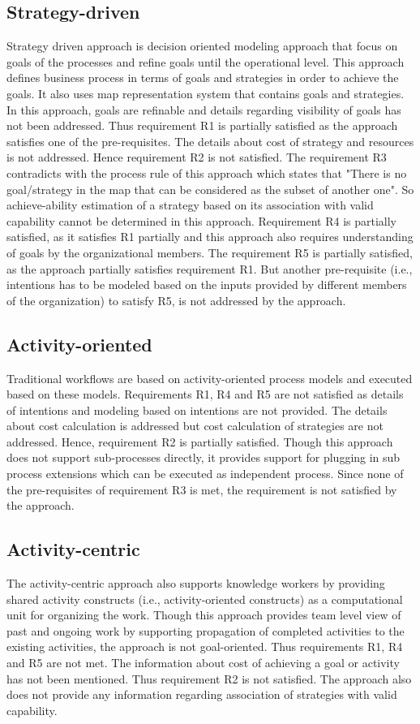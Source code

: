 \subsection{Strategy-driven} 
Strategy driven approach is decision oriented modeling approach that focus on goals of the processes and refine goals until the operational level. This approach defines business process in terms of goals and strategies in order to achieve the goals. It also uses map representation system that contains goals and strategies. In this approach, goals are refinable and details regarding visibility of goals has not been addressed. Thus requirement R1 is partially satisfied as the approach satisfies one of the pre-requisites. The details about cost of strategy and resources is not addressed. Hence requirement R2 is not satisfied. The requirement R3 contradicts with the process rule of this approach which states that "There is no goal/strategy in the map that can be considered as the subset of another one". So achieve-ability estimation of a strategy based on its association with valid capability cannot be determined in this approach. Requirement R4 is partially satisfied, as it satisfies R1 partially and this approach also requires understanding of goals by the organizational members. The requirement R5 is partially satisfied, as the approach partially satisfies requirement R1. But another pre-requisite (i.e., intentions has to be modeled based on the inputs provided by different members of the organization) to satisfy R5, is not addressed by the approach. 

\subsection{Activity-oriented} 
Traditional workflows are based on activity-oriented process models and executed based on these models. Requirements R1, R4 and R5 are not satisfied as details of intentions and modeling based on intentions are not provided. The details about cost calculation is addressed but cost calculation of strategies are not addressed. Hence, requirement R2 is partially satisfied. Though this approach does not support sub-processes directly, it provides support for plugging in sub process extensions which can be executed as independent process. Since none of the pre-requisites of requirement R3 is met, the requirement is not satisfied by the approach. 

\subsection{Activity-centric} 
The activity-centric approach also supports knowledge workers by providing shared activity constructs (i.e., activity-oriented constructs) as a computational unit for organizing the work. Though this approach provides team level view of past and ongoing work by supporting propagation of completed activities to the existing activities, the approach is not goal-oriented. Thus requirements R1, R4 and R5 are not met. The information about cost of achieving a goal or activity has not been mentioned. Thus requirement R2 is not satisfied. The approach also does not provide any information regarding association of strategies with valid capability.  
 
